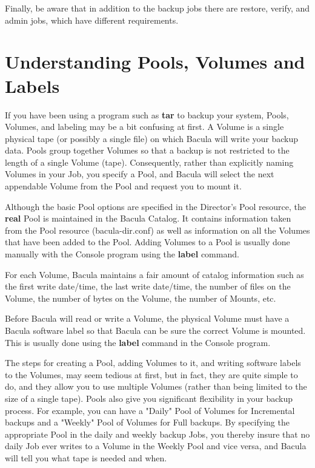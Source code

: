 Finally, be aware that in addition to the backup jobs there are 
restore, verify, and admin jobs, which have different requirements.

\label{PoolsVolsLabels}
\section{Understanding Pools, Volumes and Labels}

If you have been using a program such as {\bf tar} to backup your system,
Pools, Volumes, and labeling may be a bit confusing at first. A Volume is a
single physical tape (or possibly a single file) on which Bacula will write
your backup data. Pools group together Volumes so that a backup is not
restricted to the length of a single Volume (tape). Consequently, rather than
explicitly naming Volumes in your Job, you specify a Pool, and Bacula will
select the next appendable Volume from the Pool and request you to mount it. 

Although the basic Pool options are specified in the Director's Pool resource,
the {\bf real} Pool is maintained in the Bacula Catalog. It contains
information taken from the Pool resource (bacula-dir.conf) as well as
information on all the Volumes that have been added to the Pool. Adding
Volumes to a Pool is usually done manually with the Console program using the
{\bf label} command. 

For each Volume, Bacula maintains a fair amount of catalog information such as
the first write date/time, the last write date/time, the number of files on
the Volume, the number of bytes on the Volume, the number of Mounts, etc. 

Before Bacula will read or write a Volume, the physical Volume must have a
Bacula software label so that Bacula can be sure the correct Volume is
mounted. This is usually done using the {\bf label} command in the Console
program. 

The steps for creating a Pool, adding Volumes to it, and writing software
labels to the Volumes, may seem tedious at first, but in fact, they are quite
simple to do, and they allow you to use multiple Volumes (rather than being
limited to the size of a single tape). Pools also give you significant
flexibility in your backup process. For example, you can have a "Daily" Pool
of Volumes for Incremental backups and a "Weekly" Pool of Volumes for Full
backups. By specifying the appropriate Pool in the daily and weekly backup
Jobs, you thereby insure that no daily Job ever writes to a Volume in the
Weekly Pool and vice versa, and Bacula will tell you what tape is needed and
when. 

